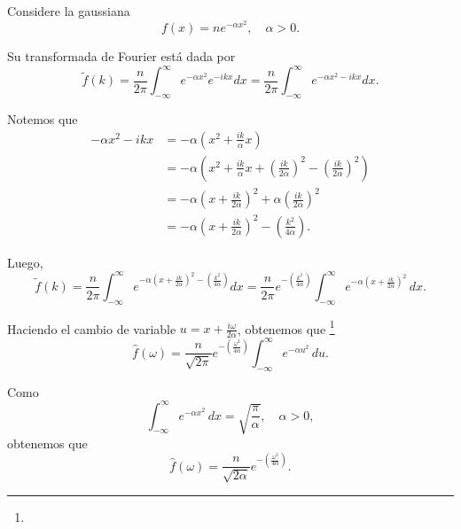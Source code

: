\begin{ejemplo}

Considere la gaussiana
$$f(x) = n e^{-\alpha x^2}, \quad  \alpha > 0.$$

Su transformada de Fourier está dada por 
\begin{equation*}
    \tilde{f}(k) =  \frac{n}{2\pi} \int_{-\infty}^{\infty} e^{-\alpha x^2} e^{-ikx} dx =  \frac{n}{2\pi} \int_{-\infty}^{\infty} e^{-\alpha x^2-ikx} dx .
\end{equation*}

Notemos que 
\begin{align*}
    -\alpha x^2-ikx &= - \alpha \left( x^2 + \frac{ik}{\alpha}x \right) \\
    &= - \alpha \left( x^2 + \frac{ik}{\alpha} x + \left( \frac{ik}{2\alpha} \right)^2 - \left( \frac{ik}{2\alpha} \right)^2 \right) \\
    &= - \alpha \left( x + \frac{ik}{2\alpha} \right)^2 + \alpha \left( \frac{ik}{2\alpha} \right)^2 \\
    &= - \alpha \left( x + \frac{ik}{2\alpha} \right)^2 - \left( \frac{k^2}{4\alpha} \right).
\end{align*}

Luego, 
\begin{equation*}
    \tilde{f}(k) =  \frac{n}{2\pi} \int_{-\infty}^{\infty} e^{-\alpha \left( x + \frac{ik}{2\alpha} \right)^2 - \left( \frac{k^2}{4\alpha} \right)}  dx = \frac{n}{2\pi} e^{- \left( \frac{k^2}{4\alpha} \right)} \int_{-\infty}^{\infty} e^{-\alpha \left( x + \frac{ik}{2\alpha} \right)^2} \,dx. 
\end{equation*}

Haciendo el cambio de variable $u = x + \frac{i\omega}{2\alpha}$, obtenemos que \footnote{}
\begin{equation}
    \hat{f}(\omega) = \frac{n}{\sqrt{2\pi}} e^{- \left( \frac{\omega^2}{4\alpha} \right)} \int_{-\infty}^{\infty} e^{-\alpha u^2} \,du.
\end{equation}

Como
\begin{equation}
\int_{-\infty}^{\infty} e^{-\alpha x^2} \,dx = \sqrt{\frac{\pi}{\alpha}}, \quad \alpha > 0,    
\end{equation} 
obtenemos que 
\begin{equation}
\hat{f}(\omega) = \frac{n}{\sqrt{2\alpha}} e^{- \left( \frac{\omega^2}{4\alpha} \right)}.  \label{eq:Fourier-Gaussiana}  
\end{equation}
\vfill
    \footnoterule
    

\end{ejemplo}

